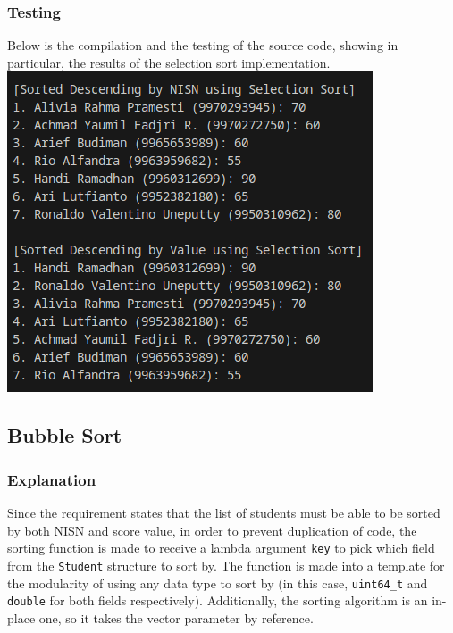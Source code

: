 \documentclass[12pt]{article}
\begin{document}
\subsubsection{Testing}
Below is the compilation and the testing of the source code, showing in particular, the results of the selection sort implementation.
\newline\includegraphics[width=\textwidth]{01_sort_search_selection}

\subsection{Bubble Sort}

\subsubsection{Explanation}

Since the requirement states that the list of students must be able to be sorted by both NISN and score value, in order to prevent duplication of code, the sorting function is made to receive a lambda argument \texttt{key} to pick which field from the \texttt{Student} structure to sort by. The function is made into a template for the modularity of using any data type to sort by (in this case, \texttt{uint64\_t} and \texttt{double} for both fields respectively). Additionally, the sorting algorithm is an in-place one, so it takes the vector parameter by reference.
\end{document}
